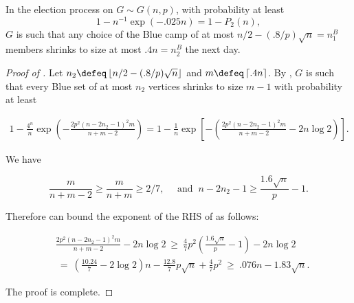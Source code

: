 \documentclass{toc}
\begin{document}
			\begin{lemma}  \label{prop:uni-sqrt-advantage-ex}
				In the election process on $G\sim G(n, p)$,
				with probability at least
				\begin{equation} \label{eq:uni-sqrt-advantage-ex}
					1 - n^{-1}\exp\left(- .025n \right) = 1 - P_2(n),
				\end{equation}
				$G$ is such that any choice of the Blue camp of at most $n/2 - (.8/p)\sqrt{n} = n_1^B$ members shrinks to size at most $.4n = n_2^B$ the next day.
			\end{lemma}
			
			\begin{proof}[Proof of ]
				Let $n_2 \defeq \left\lfloor n/2 - (.8/p)\sqrt{n} \right\rfloor$ and $m \defeq \left\lceil .4n \right\rceil$.
				By , $G$ is such that every Blue set of at most $n_2$ vertices shrinks to size $m - 1$ with probability at least
				\begin{linenomath}\begin{equation*}  \label{eq:uni-sqrt-advantage-ex-temp1}
						\begin{aligned}
							1 - \frac{4^n}{n} \exp \left(- \frac{2p^2(n - 2n_2 - 1)^2m}{n + m -2} \right)
							= 1 - \frac{1}{n} \exp \left[- \left(\frac{2p^2(n - 2n_2 - 1)^2m}{n + m -2} - 2n \log 2\right)\right].
						\end{aligned}
				\end{equation*}\end{linenomath}
				We have
				\begin{linenomath}\begin{equation*}
						\frac{m}{n + m - 2} \ge \frac{m}{n + m} \ge 2/7, \quad \text{ and } \ n - 2n_2 - 1 \ge \frac{1.6\sqrt{n}}{p} - 1.
				\end{equation*}\end{linenomath}
				Therefore can bound the exponent of the RHS of  as follows:
				\begin{linenomath}\begin{equation*}
						\begin{aligned}
							& \frac{2p^2(n - 2n_2 - 1)^2m}{n + m -2} - 2n \log 2
							\ \ge \ \frac{4}{7}p^2\left(\frac{1.6\sqrt{n}}{p} - 1 \right) - 2n\log 2 \\
							& \ = \ \left(\frac{10.24}{7} - 2\log 2\right)n - \frac{12.8}{7}p\sqrt{n} + \frac{4}{7}p^2 \ \ge \ .076n - 1.83\sqrt{n}.
						\end{aligned}
				\end{equation*}\end{linenomath}
				The proof is complete.
			\end{proof}
			
\end{document}
